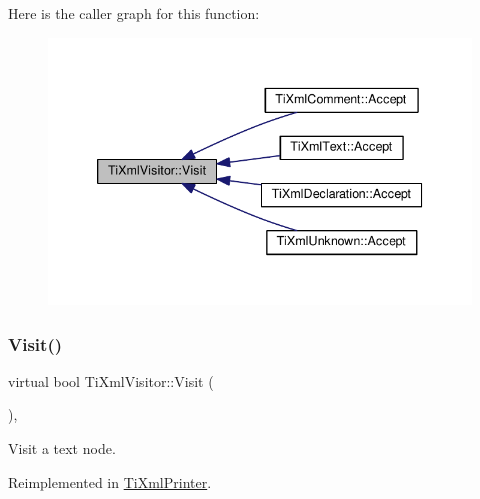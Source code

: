 Here is the caller graph for this function\+:\nopagebreak
\begin{figure}[H]
\begin{center}
\leavevmode
\includegraphics[width=339pt]{class_ti_xml_visitor_afad71c71ce6473fb9b4b64cd92de4a19_icgraph}
\end{center}
\end{figure}
\mbox{\label{class_ti_xml_visitor_a399b8ebca5cd14664974a32d2ce029e5}} 
\subsubsection{\texorpdfstring{Visit()}{Visit()}\hspace{0.1cm}{\footnotesize\ttfamily [2/4]}}
{\footnotesize\ttfamily virtual bool Ti\+Xml\+Visitor\+::\+Visit (\begin{DoxyParamCaption}\item[{const \hyperlink{class_ti_xml_text}{Ti\+Xml\+Text} \&}]{ }\end{DoxyParamCaption})\hspace{0.3cm}{\ttfamily [inline]}, {\ttfamily [virtual]}}



Visit a text node. 



Reimplemented in \hyperlink{class_ti_xml_printer_a0857c5d32c59b9a257f9a49cb9411df5}{Ti\+Xml\+Printer}.

\mbox{\label{class_ti_xml_visitor_a53a60e7a528627b31af3161972cc7fa2}} 

